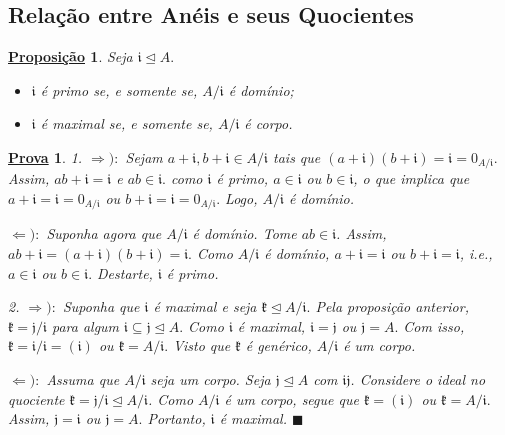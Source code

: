 \documentclass{article}
\newtheorem*{prop*}{\underline{Proposi\c c\~ao}}
\newtheorem*{proof*}{\underline{Prova}}
\renewcommand\qedsymbol{$\blacksquare$}
\begin{document}
\subsection{Relação entre Anéis e seus Quocientes}
\begin{prop*}
  Seja \(\mathfrak{i}\trianglelefteq{A}.\)
  \begin{itemize}
    \item[1)] \(\mathfrak{i}\) é primo se, e somente se, \(A/\mathfrak{i}\) é domínio;
    \item[2)] \(\mathfrak{i}\) é maximal se, e somente se, \(A/\mathfrak{i}\) é corpo.
  \end{itemize}
\end{prop*}
\begin{proof*}
  1. \(\Rightarrow ):\) Sejam \(a+\mathfrak{i}, b+\mathfrak{i}\in A/\mathfrak{i}\) tais que \((a+\mathfrak{i})(b+\mathfrak{i})=\mathfrak{i}=0_{A/\mathfrak{i}}.\) Assim,
  \(ab+\mathfrak{i} = \mathfrak{i}\) e \(ab\in \mathfrak{i}.\) como \(\mathfrak{i}\) é primo, \(a\in \mathfrak{i}\) ou \(b\in \mathfrak{i}\), o que implica que
  \(a+\mathfrak{i} = \mathfrak{i} = 0_{A/\mathfrak{i}}\) ou \(b+\mathfrak{i} = \mathfrak{i} = 0_{A/\mathfrak{i}}.\) Logo, \(A/\mathfrak{i}\) é domínio.

  \(\Leftarrow ):\) Suponha agora que \(A/\mathfrak{i}\) é domínio. Tome \(ab\in \mathfrak{i}\). Assim, \(ab + \mathfrak{i} = (a+\mathfrak{i})(b+\mathfrak{i}) = \mathfrak{i}.\)
  Como \(A/\mathfrak{i}\) é domínio, \(a+\mathfrak{i} = \mathfrak{i}\) ou \(b+\mathfrak{i} = \mathfrak{i}\), i.e., \(a\in \mathfrak{i}\) ou \(b\in \mathfrak{i}.\) Destarte, \(\mathfrak{i}\) é primo.

  2. \(\Rightarrow ):\) Suponha que \(\mathfrak{i}\) é maximal e seja \(\mathfrak{k}\trianglelefteq{A/\mathfrak{i}}.\) Pela proposição anterior,
  \(\mathfrak{k} = \mathfrak{j}/\mathfrak{i}\) para algum \(\mathfrak{i}\subseteq \mathfrak{j}\trianglelefteq{A}.\) Como \(\mathfrak{i}\) é maximal,
  \(\mathfrak{i}=\mathfrak{j}\) ou \(\mathfrak{j} = A.\) Com isso, \(\mathfrak{k} = \mathfrak{i}/\mathfrak{i} = (\mathfrak{i})\) ou \(\mathfrak{k} = A/\mathfrak{i}.\) 
  Visto que \(\mathfrak{k}\) é genérico, \(A/\mathfrak{i}\) é um corpo.

  \(\Leftarrow ):\) Assuma que \(A/\mathfrak{i}\) seja um corpo. Seja \(\mathfrak{j}\trianglelefteq{A}\) com \(\mathfrak{i}\mathfrak{j}\).
  Considere o ideal no quociente \(\mathfrak{k} = \mathfrak{j}/\mathfrak{i}\trianglelefteq{A/\mathfrak{i}}\). Como \(A/\mathfrak{i}\) é um corpo,
  segue que \(\mathfrak{k} = (\mathfrak{i})\) ou \(\mathfrak{k} = A/\mathfrak{i}.\) Assim, \(\mathfrak{j} = \mathfrak{i}\) ou \(\mathfrak{j} = A.\)
  Portanto, \(\mathfrak{i}\) é maximal. \qedsymbol
\end{proof*}
\end{document}
